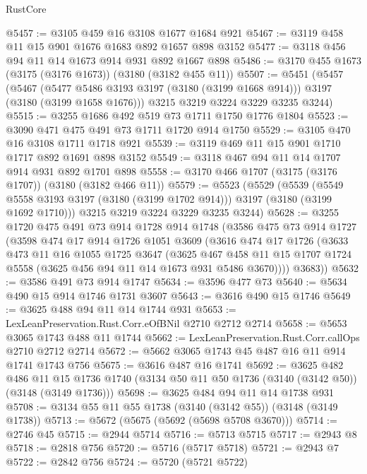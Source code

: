 \begin{lexlean}{RustCore}
\begin{coremodule}
@5457 := @3105 @459 @16 @3108 @1677 @1684 @921
@5467 := @3119 @458 @11 @15 @901 @1676 @1683 @892 @1657 @898 @3152
@5477 := @3118 @456 @94 @11 @14 @1673 @914 @931 @892 @1667 @898
@5486 := @3170 @455 @1673 (@3175 (@3176 @1673)) (@3180 (@3182 @455 @11))
@5507 := @5451
    (@5457
      (@5467 (@5477 @5486 @3193 @3197 (@3180 (@3199 @1668 @914))) @3197 (@3180 (@3199 @1658 @1676)))
      @3215
      @3219
      @3224
      @3229
      @3235
      @3244)
@5515 := @3255 @1686 @492 @519 @73 @1711 @1750 @1776 @1804
@5523 := @3090 @471 @475 @491 @73 @1711 @1720 @914 @1750
@5529 := @3105 @470 @16 @3108 @1711 @1718 @921
@5539 := @3119 @469 @11 @15 @901 @1710 @1717 @892 @1691 @898 @3152
@5549 := @3118 @467 @94 @11 @14 @1707 @914 @931 @892 @1701 @898
@5558 := @3170 @466 @1707 (@3175 (@3176 @1707)) (@3180 (@3182 @466 @11))
@5579 := @5523
    (@5529
      (@5539 (@5549 @5558 @3193 @3197 (@3180 (@3199 @1702 @914))) @3197 (@3180 (@3199 @1692 @1710)))
      @3215
      @3219
      @3224
      @3229
      @3235
      @3244)
@5628 := @3255
    @1720
    @475
    @491
    @73
    @914
    @1728
    @914
    @1748
    (@3586
      @475
      @73
      @914
      @1727
      (@3598
        @474
        @17
        @914
        @1726
        @1051
        @3609
        (@3616
          @474
          @17
          @1726
          (@3633
            @473
            @11
            @16
            @1055
            @1725
            @3647
            (@3625
              @467
              @458
              @11
              @15
              @1707
              @1724
              @5558
              (@3625 @456 @94 @11 @14 @1673 @931 @5486 @3670))))
        @3683))
@5632 := @3586 @491 @73 @914 @1747
@5634 := @3596 @477 @73
@5640 := @5634 @490 @15 @914 @1746 @1731 @3607
@5643 := @3616 @490 @15 @1746
@5649 := @3625 @488 @94 @11 @14 @1744 @931
@5653 := LexLeanPreservation.Rust.Corr.eOfBNil @2710 @2712 @2714
@5658 := @5653 @3065 @1743 @488 @11 @1744
@5662 := LexLeanPreservation.Rust.Corr.callOps @2710 @2712 @2714
@5672 := @5662 @3065 @1743 @45 @487 @16 @11 @914 @1741 @1743 @756
@5675 := @3616 @487 @16 @1741
@5692 := @3625
    @482
    @486
    @11
    @15
    @1736
    @1740
    (@3134 @50 @11 @50 @1736 (@3140 (@3142 @50)) (@3148 (@3149 @1736)))
@5698 := @3625 @484 @94 @11 @14 @1738 @931
@5708 := @3134 @55 @11 @55 @1738 (@3140 (@3142 @55)) (@3148 (@3149 @1738))
@5713 := @5672 (@5675 (@5692 (@5698 @5708 @3670)))
@5714 := @2746 @45
@5715 := @2944 @5714
@5716 := @5713 @5715
@5717 := @2943 @8
@5718 := @2818 @756
@5720 := @5716 (@5717 @5718)
@5721 := @2943 @7
@5722 := @2842 @756
@5724 := @5720 (@5721 @5722)

\end{coremodule}
\end{lexlean}
